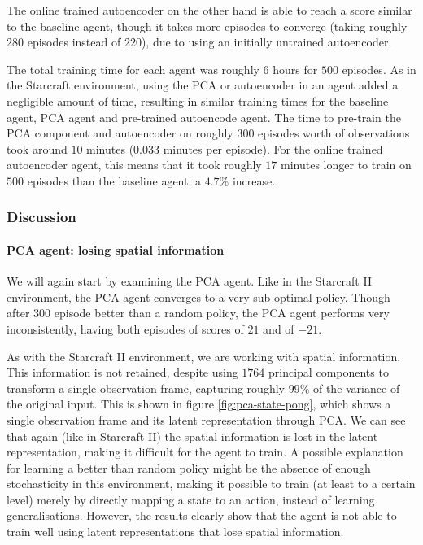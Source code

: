 The online trained autoencoder on the other hand is able to reach a score similar to the baseline agent, though it takes more episodes to converge (taking roughly $280$ episodes instead of $220$), due to using an initially untrained autoencoder.

The total training time for each agent was roughly 6 hours for $500$ episodes. As in the Starcraft environment, using the PCA or autoencoder in an agent added a negligible amount of time, resulting in similar training times for the baseline agent, PCA agent and pre-trained autoencode agent. The time to pre-train the PCA component and autoencoder on roughly $300$ episodes worth of observations took around $10$ minutes ($0.033$ minutes per episode). For the online trained autoencoder agent, this means that it took roughly $17$ minutes longer to train on $500$ episodes than the baseline agent: a $4.7\%$ increase.

\clearpage
\subsubsection{Discussion}\label{research-discussion-pong}
\paragraph{PCA agent: losing spatial information}
We will again start by examining the PCA agent. Like in the Starcraft II environment, the PCA agent converges to a very sub-optimal policy. Though after $300$ episode better than a random policy, the PCA agent performs very inconsistently, having both episodes of scores of $21$ and of $-21$.

As with the Starcraft II environment, we are working with spatial information. This information is not retained, despite using $1764$ principal components to transform a single observation frame, capturing roughly $99\%$ of the variance of the original input. This is shown in figure \ref{fig:pca-state-pong}, which shows a single observation frame and its latent representation through PCA. We can see that again (like in Starcraft II) the spatial information is lost in the latent representation, making it difficult for the agent to train. A possible explanation for learning a better than random policy might be the absence of enough stochasticity in this environment, making it possible to train (at least to a certain level) merely by directly mapping a state to an action, instead of learning generalisations. However, the results clearly show that the agent is not able to train well using latent representations that lose spatial information.


